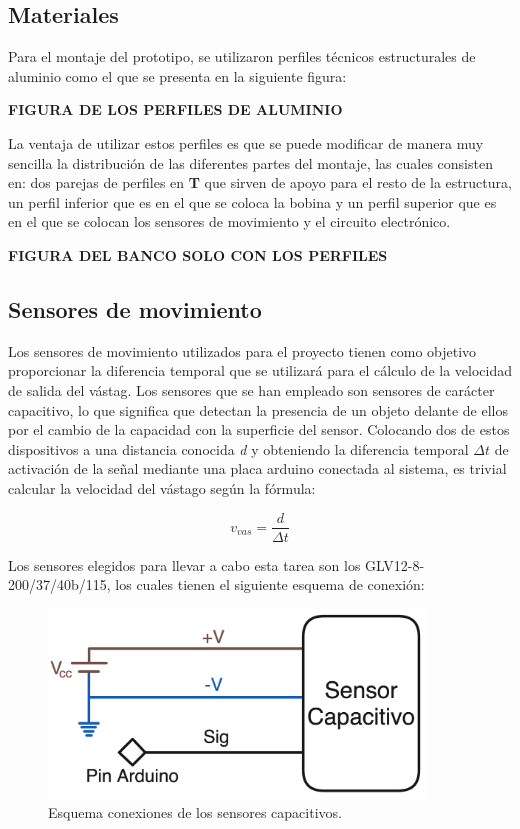 \newpage

\subsection{Materiales}
\label{subsec:materiales}
Para el montaje del prototipo, se utilizaron perfiles técnicos estructurales de aluminio como el que se presenta en la siguiente figura:

\textbf{FIGURA DE LOS PERFILES DE ALUMINIO}

La ventaja de utilizar estos perfiles es que se puede modificar de manera muy sencilla la distribución de las diferentes partes del montaje, las cuales consisten en: dos parejas de perfiles en \textbf{T} que sirven de apoyo para el resto de la estructura, un perfil inferior que es en el que se coloca la bobina y un perfil superior que es en el que se colocan los sensores de movimiento y el circuito electrónico.

\textbf{FIGURA DEL BANCO SOLO CON LOS PERFILES}

\subsection{Sensores de movimiento}
\label{subsec:sensoresmov}

Los sensores de movimiento utilizados para el proyecto tienen como objetivo proporcionar la diferencia temporal que se utilizará para el cálculo de la velocidad de salida del vástag. Los sensores que se han empleado son sensores de carácter capacitivo, lo que significa que detectan la presencia de un objeto delante de ellos por el cambio de la capacidad con la superficie del sensor. Colocando dos de estos dispositivos a una distancia conocida \textit{d} y obteniendo la diferencia temporal \(\Delta t\) de activación de la señal mediante una placa arduino conectada al sistema, es trivial calcular la velocidad del vástago según la fórmula:

\[v_{vas}=\frac{d}{\Delta t}\]

Los sensores elegidos para llevar a cabo esta tarea son los GLV12-8-200/37/40b/115, los cuales tienen el siguiente esquema de conexión:

\begin{figure}[H]
    \centering
    \includegraphics[width=10cm]{FigurasMemoria/esquemaSensor.png}
    \caption{Esquema conexiones de los sensores capacitivos.}
    \label{fig:esquemaSensor} %
\end{figure}

